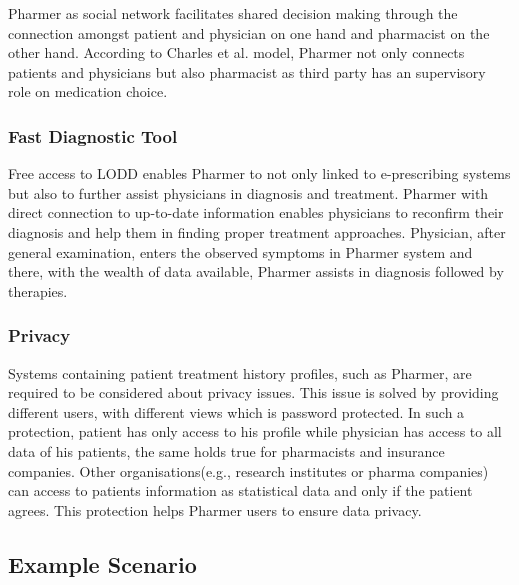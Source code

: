 \documentclass[journal]{IEEEtran}
\begin{document}
Pharmer as social network facilitates shared decision making through the connection amongst patient and physician on one hand and pharmacist on the other hand. According to Charles et al. model, Pharmer not only connects patients and physicians but also pharmacist as third party has an supervisory role on medication choice.\\

\subsubsection{Fast Diagnostic Tool}

Free access to LODD enables Pharmer to not only linked to e-prescribing systems but also to further assist physicians in diagnosis and treatment. Pharmer with direct connection to up-to-date information enables physicians to reconfirm their diagnosis and help them in finding proper treatment approaches.
Physician, after general examination, enters the observed symptoms in Pharmer system and there, with the wealth of data available, Pharmer assists in diagnosis followed by therapies.\\

\subsubsection{Privacy}
 Systems containing patient treatment history profiles, such as Pharmer, are required to be considered about privacy issues.
 This issue is solved by providing different users, with different views which is password protected.
 In such a protection, patient has only access to his profile while physician has access to all data of his patients, the same holds true for pharmacists and insurance companies.
 Other organisations(e.g., research institutes or pharma companies) can access to patients information as statistical data and only if the patient agrees.
 This protection helps Pharmer users to ensure data privacy.\\

\subsection{Example Scenario}
\label{sec:example}
\end{document}
